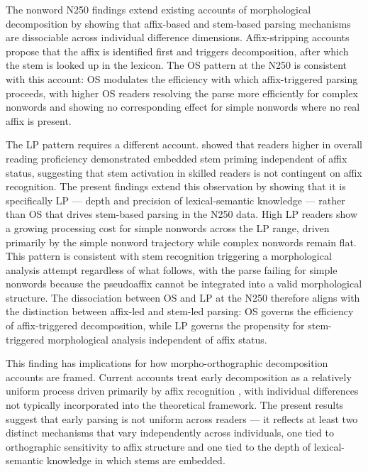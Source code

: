 \documentclass[utf8]{FrontiersinHarvard} %
\begin{document}
	The nonword N250 findings extend existing accounts of morphological decomposition by showing that affix-based and stem-based parsing mechanisms are dissociable across individual difference dimensions. Affix-stripping accounts \citep{taft_lexical_1975, rastleMorphologicalDecompositionBased2008} propose that the affix is identified first and triggers decomposition, after which the stem is looked up in the lexicon. The OS pattern at the N250 is consistent with this account: OS modulates the efficiency with which affix-triggered parsing proceeds, with higher OS readers resolving the parse more efficiently for complex nonwords and showing no corresponding effect for simple nonwords where no real affix is present.
	
	The LP pattern requires a different account. \citet{beyersmannEmbeddedStemPriming2016} showed that readers higher in overall reading proficiency demonstrated embedded stem priming independent of affix status, suggesting that stem activation in skilled readers is not contingent on affix recognition. The present findings extend this observation by showing that it is specifically LP --- depth and precision of lexical-semantic knowledge --- rather than OS that drives stem-based parsing in the N250 data. High LP readers show a growing processing cost for simple nonwords across the LP range, driven primarily by the simple nonword trajectory while complex nonwords remain flat. This pattern is consistent with stem recognition triggering a morphological analysis attempt regardless of what follows, with the parse failing for simple nonwords because the pseudoaffix cannot be integrated into a valid morphological structure. The dissociation between OS and LP at the N250 therefore aligns with the distinction between affix-led and stem-led parsing: OS governs the efficiency of affix-triggered decomposition, while LP governs the propensity for stem-triggered morphological analysis independent of affix status.
	
	This finding has implications for how morpho-orthographic decomposition accounts are framed. Current accounts treat early decomposition as a relatively uniform process driven primarily by affix recognition \citep{rastleMorphologicalDecompositionBased2008}, with individual differences not typically incorporated into the theoretical framework. The present results suggest that early parsing is not uniform across readers --- it reflects at least two distinct mechanisms that vary independently across individuals, one tied to orthographic sensitivity to affix structure and one tied to the depth of lexical-semantic knowledge in which stems are embedded.
	
\end{document}
